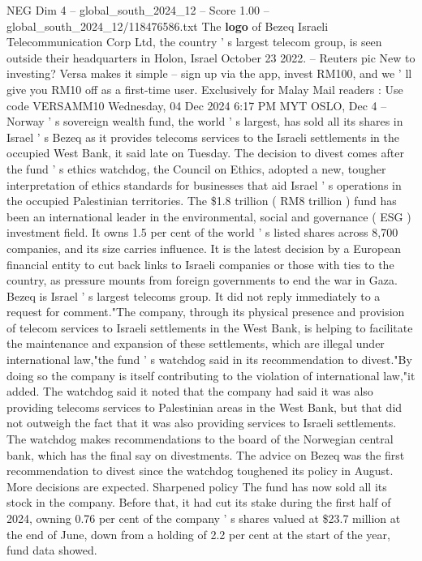\begin{textsample}{NEG Dim 4 – global\_south\_2024\_12 – Score 1.00 – global\_south\_2024\_12/118476586.txt}  \label{ex:f4_neg_207}
The \textbf{logo} of Bezeq Israeli Telecommunication Corp Ltd, the country ' s largest telecom group, is seen outside their headquarters in Holon, Israel October 23 2022. -- Reuters pic New to investing?
Versa makes it simple -- sign up via the app, invest RM100, and we ' ll give you RM10 off as a first-time user.
Exclusively for Malay Mail readers : Use code VERSAMM10 Wednesday, 04 Dec 2024 6:17 PM MYT OSLO, Dec 4 -- Norway ' s sovereign wealth fund, the world ' s largest, has sold all its shares in Israel ' s Bezeq as it provides telecoms services to the Israeli settlements in the occupied West Bank, it said late on Tuesday.
The decision to divest comes after the fund ' s ethics watchdog, the Council on Ethics, adopted a new, tougher interpretation of ethics standards for businesses that aid Israel ' s operations in the occupied Palestinian territories.
The \$1.8 trillion ( RM8 trillion ) fund has been an international leader in the environmental, social and governance ( ESG ) investment field.
It owns 1.5 per cent of the world ' s listed shares across 8,700 companies, and its size carries influence.
It is the latest decision by a European financial entity to cut back links to Israeli companies or those with ties to the country, as pressure mounts from foreign governments to end the war in Gaza.
Bezeq is Israel ' s largest telecoms group.
It did not reply immediately to a request for comment."The company, through its physical presence and provision of telecom services to Israeli settlements in the West Bank, is helping to facilitate the maintenance and expansion of these settlements, which are illegal under international law,"the fund ' s watchdog said in its recommendation to divest."By doing so the company is itself contributing to the violation of international law,"it added.
The watchdog said it noted that the company had said it was also providing telecoms services to Palestinian areas in the West Bank, but that did not outweigh the fact that it was also providing services to Israeli settlements.
The watchdog makes recommendations to the board of the Norwegian central bank, which has the final say on divestments.
The advice on Bezeq was the first recommendation to divest since the watchdog toughened its policy in August.
More decisions are expected.
Sharpened policy The fund has now sold all its stock in the company.
Before that, it had cut its stake during the first half of 2024, owning 0.76 per cent of the company ' s shares valued at \$23.7 million at the end of June, down from a holding of 2.2 per cent at the start of the year, fund data showed.

\end{textsample}
